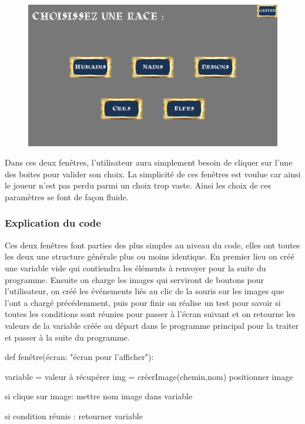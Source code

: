 \documentclass{article}
\begin{document}
	\begin{figure}[h]
	\center
	\includegraphics[scale=0.15]{../images/GUIraces.png}
  	\end{figure}
		
		Dans ces deux fenêtres, l'utilisateur aura simplement besoin de cliquer sur l'une des boites pour valider son choix. La simplicité de ces fenêtres est voulue car ainsi le joueur n'est pas perdu parmi un choix trop vaste. Ainsi les choix de ces paramètres se font de façon fluide.
		
  \subsubsection{Explication du code }		
		Ces deux fenêtres font parties des plus simples au niveau du code, elles ont toutes les deux une structure générale plus ou moins identique. En premier lieu on créé une variable vide qui contiendra les éléments à renvoyer pour la suite du programme. Ensuite on charge les images qui serviront de boutons pour l'utilisateur, on créé les événements liés au clic de la souris sur les images que l'ont a chargé précédemment, puis pour finir on réalise un test pour savoir si toutes les conditions sont réunies pour passer à l'écran suivant et on retourne les valeurs de la variable créée au départ dans le programme principal pour la traiter et passer à la suite du programme.
		
		def fenêtre(écran: "écran pour l'afficher"):
			
			variable = valeur à récupérer
			img = créerImage(chemin,nom)
			positionner image 
			
			si clique sur image:
				mettre nom image dans variable 
			
			si condition réunis :
				retourner variable
				
\end{document}
